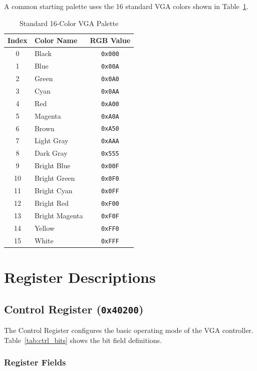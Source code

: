 \documentclass[11pt,letterpaper]{report}
\begin{document}
A common starting palette uses the 16 standard VGA colors shown in Table~\ref{tab:standardpalette}.

\begin{table}[tbp]
\centering
\caption{Standard 16-Color VGA Palette}
\label{tab:standardpalette}
\begin{tabular}{clc}
\toprule
\textbf{Index} & \textbf{Color Name} & \textbf{RGB Value} \\
\midrule
0 & Black & \texttt{0x000} \\
1 & Blue & \texttt{0x00A} \\
2 & Green & \texttt{0x0A0} \\
3 & Cyan & \texttt{0x0AA} \\
4 & Red & \texttt{0xA00} \\
5 & Magenta & \texttt{0xA0A} \\
6 & Brown & \texttt{0xA50} \\
7 & Light Gray & \texttt{0xAAA} \\
8 & Dark Gray & \texttt{0x555} \\
9 & Bright Blue & \texttt{0x00F} \\
10 & Bright Green & \texttt{0x0F0} \\
11 & Bright Cyan & \texttt{0x0FF} \\
12 & Bright Red & \texttt{0xF00} \\
13 & Bright Magenta & \texttt{0xF0F} \\
14 & Yellow & \texttt{0xFF0} \\
15 & White & \texttt{0xFFF} \\
\bottomrule
\end{tabular}
\end{table}

\chapter{Register Descriptions}
\label{ch:registers}

\section{Control Register (\texttt{0x40200})}

The Control Register configures the basic operating mode of the VGA controller. Table~\ref{tab:ctrl_bits} shows the bit field definitions.

\subsection{Register Fields}
\end{document}

